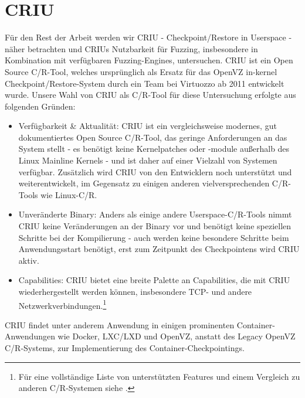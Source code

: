 \documentclass[a4paper]{article}
\begin{document}



\section{CRIU}
Für den Rest der Arbeit werden wir CRIU - Checkpoint/Restore in Userspace - näher betrachten und CRIUs Nutzbarkeit für Fuzzing, insbesondere in Kombination mit verfügbaren Fuzzing-Engines, untersuchen. 
CRIU ist ein Open Source C/R-Tool, welches ursprünglich als Ersatz für das OpenVZ in-kernel Checkpoint/Restore-System durch ein Team bei Virtuozzo ab 2011 entwickelt wurde\cite{criuhistory}. 
Unsere Wahl von CRIU als C/R-Tool für diese Untersuchung erfolgte aus folgenden Gründen:
\begin{itemize}
    \item Verfügbarkeit \& Aktualität: CRIU ist ein vergleichsweise modernes, gut dokumentiertes Open Source C/R-Tool, das geringe Anforderungen an das System stellt - es benötigt keine Kernelpatches oder -module außerhalb des Linux Mainline Kernels - und ist daher auf einer Vielzahl von Systemen verfügbar. Zusätzlich wird CRIU von den Entwicklern noch unterstützt und weiterentwickelt, im Gegensatz zu einigen anderen vielversprechenden C/R-Tools wie Linux-C/R.
    \item Unveränderte Binary: Anders als einige andere Userspace-C/R-Tools nimmt CRIU keine Veränderungen an der Binary vor und benötigt keine speziellen Schritte bei der Kompilierung - auch werden keine besondere Schritte beim Anwendungsstart benötigt, erst zum Zeitpunkt des Checkpointens wird CRIU aktiv.
    \item Capabilities: CRIU bietet eine breite Palette an Capabilities, die mit CRIU wiederhergestellt werden können, insbesondere TCP- und andere Netzwerkverbindungen.\footnote{Für eine vollständige Liste von unterstützten Features und einem Vergleich zu anderen C/R-Systemen siehe .}
\end{itemize}
CRIU findet unter anderem Anwendung in einigen prominenten Container-Anwendungen wie Docker, LXC/LXD und OpenVZ, anstatt des Legacy OpenVZ C/R-Systems, zur Implementierung des Container-Checkpointings.\\
\end{document}
